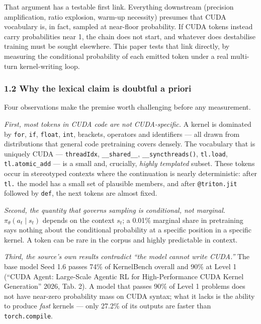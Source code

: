 \documentclass[
  11pt,
]{article}
\begin{document}
That argument has a testable first link. Everything downstream
(precision amplification, ratio explosion, warm-up necessity) presumes
that CUDA vocabulary is, in fact, sampled at near-floor probability. If
CUDA tokens instead carry probabilities near 1, the chain does not
start, and whatever does destabilise training must be sought elsewhere.
This paper tests that link directly, by measuring the conditional
probability of each emitted token under a real multi-turn kernel-writing
loop.

\hypertarget{why-the-lexical-claim-is-doubtful-a-priori}{%
\subsubsection{1.2 Why the lexical claim is doubtful a
priori}\label{why-the-lexical-claim-is-doubtful-a-priori}}

Four observations make the premise worth challenging before any
measurement.

\emph{First, most tokens in CUDA code are not CUDA-specific.} A kernel
is dominated by \texttt{for}, \texttt{if}, \texttt{float}, \texttt{int},
brackets, operators and identifiers --- all drawn from distributions
that general code pretraining covers densely. The vocabulary that is
uniquely CUDA --- \texttt{threadIdx}, \texttt{\_\_shared\_\_},
\texttt{\_\_syncthreads()}, \texttt{tl.load}, \texttt{tl.atomic\_add}
--- is a small and, crucially, \emph{highly templated} subset. These
tokens occur in stereotyped contexts where the continuation is nearly
deterministic: after \texttt{tl.} the model has a small set of plausible
members, and after \texttt{@triton.jit} followed by \texttt{def}, the
next tokens are almost fixed.

\emph{Second, the quantity that governs sampling is conditional, not
marginal.} \(\pi_\theta(a_t \mid s_t)\) depends on the context \(s_t\);
a 0.01\% marginal share in pretraining says nothing about the
conditional probability at a specific position in a specific kernel. A
token can be rare in the corpus and highly predictable in context.

\emph{Third, the source's own results contradict ``the model cannot
write CUDA.''} The base model Seed 1.6 passes 74\% of KernelBench
overall and 90\% at Level 1 ({``{CUDA Agent}: Large-Scale Agentic {RL}
for High-Performance {CUDA} Kernel Generation''} 2026, Tab. 2). A model
that passes 90\% of Level 1 problems does not have near-zero probability
mass on CUDA syntax; what it lacks is the ability to produce \emph{fast}
kernels --- only 27.2\% of its outputs are faster than
\texttt{torch.compile}.
\end{document}
